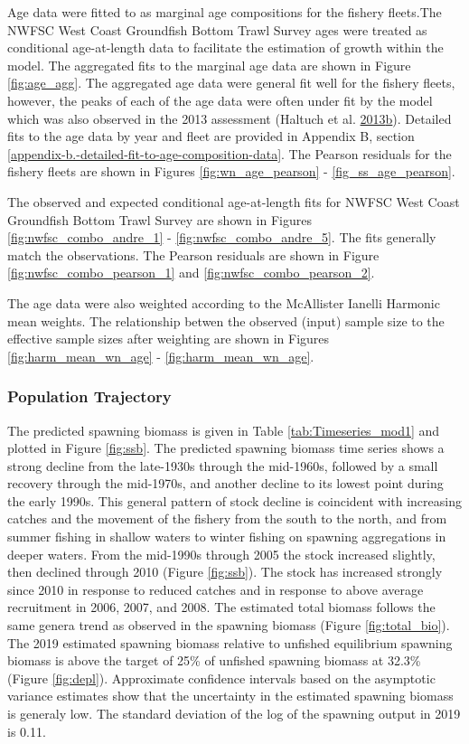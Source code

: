 \documentclass[12pt,]{article}
\begin{document}
Age data were fitted to as marginal age compositions for the fishery
fleets.The NWFSC West Coast Groundfish Bottom Trawl Survey ages were
treated as conditional age-at-length data to facilitate the estimation
of growth within the model. The aggregated fits to the marginal age data
are shown in Figure \ref{fig:age_agg}. The aggregated age data were
general fit well for the fishery fleets, however, the peaks of each of
the age data were often under fit by the model which was also observed
in the 2013 assessment (Haltuch et al.
\protect\hyperlink{ref-haltuch_status_2013}{2013}\protect\hyperlink{ref-haltuch_status_2013}{b}).
Detailed fits to the age data by year and fleet are provided in Appendix
B, section \ref{appendix-b.-detailed-fit-to-age-composition-data}. The
Pearson residuals for the fishery fleets are shown in Figures
\ref{fig:wn_age_pearson} - \ref{fig_ss_age_pearson}.

The observed and expected conditional age-at-length fits for NWFSC West
Coast Groundfish Bottom Trawl Survey are shown in Figures
\ref{fig:nwfsc_combo_andre_1} - \ref{fig:nwfsc_combo_andre_5}. The fits
generally match the observations. The Pearson residuals are shown in
Figure \ref{fig:nwfsc_combo_pearson_1} and
\ref{fig:nwfsc_combo_pearson_2}.

The age data were also weighted according to the McAllister Ianelli
Harmonic mean weights. The relationship betwen the observed (input)
sample size to the effective sample sizes after weighting are shown in
Figures \ref{fig:harm_mean_wn_age} - \ref{fig:harm_mean_wn_age}.

\subsubsection{Population Trajectory}\label{population-trajectory}

The predicted spawning biomass is given in Table
\ref{tab:Timeseries_mod1} and plotted in Figure \ref{fig:ssb}. The
predicted spawning biomass time series shows a strong decline from the
late-1930s through the mid-1960s, followed by a small recovery through
the mid-1970s, and another decline to its lowest point during the early
1990s. This general pattern of stock decline is coincident with
increasing catches and the movement of the fishery from the south to the
north, and from summer fishing in shallow waters to winter fishing on
spawning aggregations in deeper waters. From the mid-1990s through 2005
the stock increased slightly, then declined through 2010 (Figure
\ref{fig:ssb}). The stock has increased strongly since 2010 in response
to reduced catches and in response to above average recruitment in 2006,
2007, and 2008. The estimated total biomass follows the same genera
trend as observed in the spawning biomass (Figure \ref{fig:total_bio}).
The 2019 estimated spawning biomass relative to unfished equilibrium
spawning biomass is above the target of 25\% of unfished spawning
biomass at 32.3\% (Figure \ref{fig:depl}). Approximate confidence
intervals based on the asymptotic variance estimates show that the
uncertainty in the estimated spawning biomass is generaly low. The
standard deviation of the log of the spawning output in 2019 is 0.11.
\end{document}
